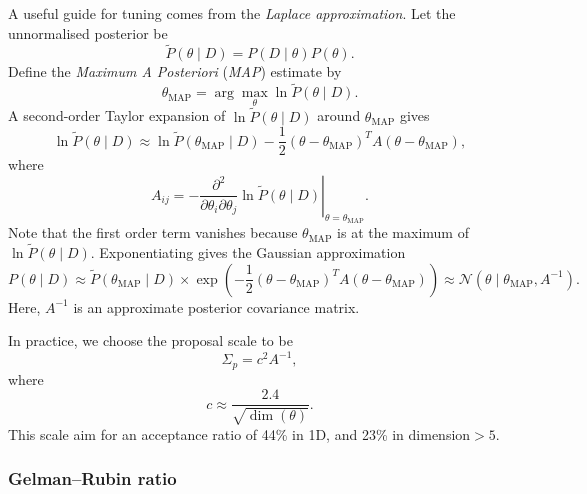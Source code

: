 \documentclass[11pt, titlepage]{article} %
\numberwithin{equation}{section}
\theoremstyle{definition}
\numberwithin{assumption}{section}
\begin{document}
A useful guide for tuning comes from the \textit{Laplace approximation}. Let the unnormalised posterior be
\begin{equation*}
    \tilde P(\theta\mid D)=P(D\mid \theta)P(\theta).
\end{equation*}
Define the \textit{Maximum A Posteriori} (\textit{MAP}) estimate by
\begin{equation*}
    \theta_{\mathrm{MAP}}=\arg\max_\theta \ln \tilde P(\theta\mid D).
\end{equation*}
A second-order Taylor expansion of $\ln \tilde P(\theta\mid D)$ around $\theta_{\mathrm{MAP}}$ gives
\begin{equation*}
    \ln \tilde P(\theta\mid D)
    \approx
    \ln \tilde P(\theta_{\mathrm{MAP}}\mid D)
    -\frac{1}{2}(\theta-\theta_{\mathrm{MAP}})^T
    A(\theta-\theta_{\mathrm{MAP}}),
\end{equation*}
where
\begin{equation*}
    A_{ij}
    =
    -\left.\frac{\partial^2}{\partial \theta_i\partial \theta_j}
    \ln \tilde P(\theta\mid D)\right|_{\theta=\theta_{\mathrm{MAP}}}.
\end{equation*}
Note that the first order term vanishes because $\theta_{\mathrm{MAP}}$ is at the maximum of $\ln \tilde P(\theta\mid D)$.
Exponentiating gives the Gaussian approximation
\begin{equation*}
    P(\theta\mid D)\approx \tilde P(\theta_{\mathrm{MAP}}\mid D)\times \exp\left(-\frac{1}{2}(\theta-\theta_{\mathrm{MAP}})^TA(\theta-\theta_{\mathrm{MAP}})\right)
    \approx
    \mathcal{N}(\theta\mid \theta_{\mathrm{MAP}},A^{-1}).
\end{equation*}
Here, $A^{-1}$ is an approximate posterior covariance matrix.

In practice, we choose the proposal scale to be 
\begin{equation*}
    \Sigma_p=c^2A^{-1},
\end{equation*}
where
\begin{equation*}
    c\approx \frac{2.4}{\sqrt{\dim(\theta)}}.
\end{equation*}
This scale aim for an acceptance ratio of 44\% in 1D, and 23\% in dimension$>5$.




\subsubsection*{Gelman--Rubin ratio}
\end{document}
